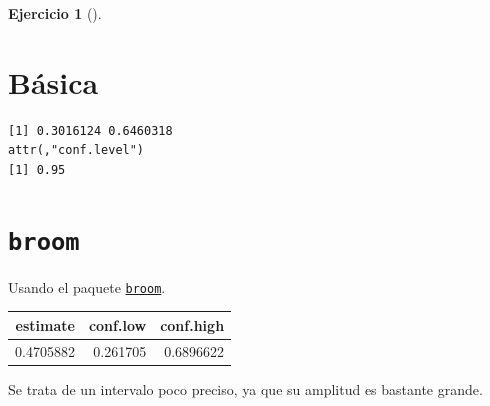\documentclass[
  a4paper,
]{scrreport}
\newenvironment{Shaded}{\begin{snugshade}}{\end{snugshade}}
\newcommand{\AttributeTok}[1]{\textcolor[rgb]{0.40,0.45,0.13}{#1}}
\newcommand{\FloatTok}[1]{\textcolor[rgb]{0.68,0.00,0.00}{#1}}
\newcommand{\FunctionTok}[1]{\textcolor[rgb]{0.28,0.35,0.67}{#1}}
\newcommand{\NormalTok}[1]{\textcolor[rgb]{0.00,0.23,0.31}{#1}}
\newcommand{\OtherTok}[1]{\textcolor[rgb]{0.00,0.23,0.31}{#1}}
\newcommand{\SpecialCharTok}[1]{\textcolor[rgb]{0.37,0.37,0.37}{#1}}
\newcommand{\StringTok}[1]{\textcolor[rgb]{0.13,0.47,0.30}{#1}}
\theoremstyle{definition}
\newtheorem{exercise}{Ejercicio}[chapter]
\theoremstyle{remark}
\begin{document}
\begin{exercise}[]
\begin{enumerate}
\begin{tcolorbox}
  \section{Básica}

\begin{Shaded}
\end{Shaded}

\begin{verbatim}
[1] 0.3016124 0.6460318
attr(,"conf.level")
[1] 0.95
\end{verbatim}

  \section{\texorpdfstring{\texttt{broom}}{broom}}

  Usando el paquete
  \href{https://broom.tidymodels.org/articles/broom.html}{\texttt{broom}}.

\begin{Shaded}
\end{Shaded}

  \begin{tabular}{r|r|r}
  \hline
  estimate & conf.low & conf.high\\
  \hline
  0.4705882 & 0.261705 & 0.6896622\\
  \hline
  \end{tabular}

  Se trata de un intervalo poco preciso, ya que su amplitud es bastante
  grande.


\end{tcolorbox}
\end{enumerate}
\end{exercise}
\end{document}
